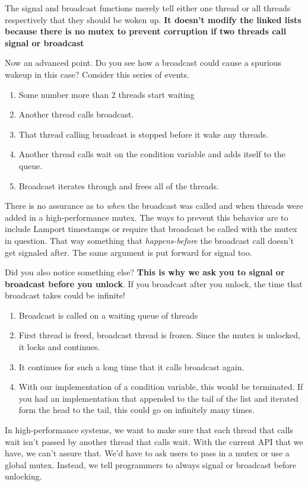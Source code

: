 The signal and broadcast functions merely tell either one thread or all threads respectively that they should be woken up.
\textbf{It doesn't modify the linked lists because there is no mutex to prevent corruption if two threads call signal or broadcast}

Now an advanced point. Do you see how a broadcast could cause a spurious wakeup in this case? Consider this series of events.

\begin{enumerate}
\item Some number more than 2 threads start waiting
\item Another thread calls broadcast.
\item That thread calling broadcast is stopped before it wake any threads.
\item Another thread calls wait on the condition variable and adds itself to the queue.
\item Broadcast iterates through and frees all of the threads.
\end{enumerate}

There is no assurance as to \textit{when} the broadcast was called and when threads were added in a high-performance mutex.
The ways to prevent this behavior are to include Lamport timestamps or require that broadcast be called with the mutex in question.
That way something that \textit{happens-before} the broadcast call doesn't get signaled after.
The same argument is put forward for signal too.

Did you also notice something else?
\textbf{This is why we ask you to signal or broadcast before you unlock}.
If you broadcast after you unlock, the time that broadcast takes could be infinite!
\begin{enumerate}
\item Broadcast is called on a waiting queue of threads
\item First thread is freed, broadcast thread is frozen. Since the mutex is unlocked, it locks and continues.
\item It continues for such a long time that it calls broadcast again.
\item With our implementation of a condition variable, this would be terminated. If you had an implementation that appended to the tail of the list and iterated form the head to the tail, this could go on infinitely many times.
\end{enumerate}

In high-performance systems, we want to make sure that each thread that calls wait isn't passed by another thread that calls wait.
With the current API that we have, we can't assure that.
We'd have to ask users to pass in a mutex or use a global mutex.
Instead, we tell programmers to always signal or broadcast before unlocking.

